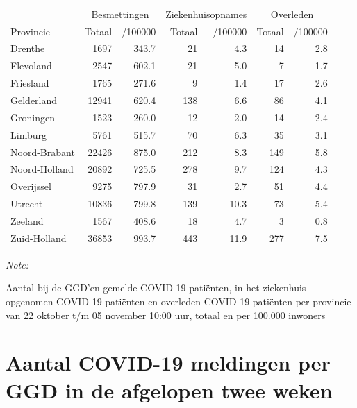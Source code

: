 \documentclass[
  english,
  man,floatsintext]{apa6}
\begin{document}
\begin{table}[H]
\centering
\begin{threeparttable}
\begin{tabular}{lrrrrrr}
\toprule
\multicolumn{1}{c}{ } & \multicolumn{2}{c}{Besmettingen} & \multicolumn{2}{c}{Ziekenhuisopnames} & \multicolumn{2}{c}{Overleden} \\
\cmidrule(l{3pt}r{3pt}){2-3} \cmidrule(l{3pt}r{3pt}){4-5} \cmidrule(l{3pt}r{3pt}){6-7}
Provincie & Totaal & /100000 & Totaal & /100000 & Totaal & /100000\\
\midrule
Drenthe & 1697 & 343.7 & 21 & 4.3 & 14 & 2.8\\
Flevoland & 2547 & 602.1 & 21 & 5.0 & 7 & 1.7\\
Friesland & 1765 & 271.6 & 9 & 1.4 & 17 & 2.6\\
Gelderland & 12941 & 620.4 & 138 & 6.6 & 86 & 4.1\\
Groningen & 1523 & 260.0 & 12 & 2.0 & 14 & 2.4\\
Limburg & 5761 & 515.7 & 70 & 6.3 & 35 & 3.1\\
Noord-Brabant & 22426 & 875.0 & 212 & 8.3 & 149 & 5.8\\
Noord-Holland & 20892 & 725.5 & 278 & 9.7 & 124 & 4.3\\
Overijssel & 9275 & 797.9 & 31 & 2.7 & 51 & 4.4\\
Utrecht & 10836 & 799.8 & 139 & 10.3 & 73 & 5.4\\
Zeeland & 1567 & 408.6 & 18 & 4.7 & 3 & 0.8\\
Zuid-Holland & 36853 & 993.7 & 443 & 11.9 & 277 & 7.5\\
\bottomrule
\end{tabular}
\begin{tablenotes}
\item \textit{Note: } 
\item Aantal bij de GGD’en gemelde COVID-19 patiënten, in het ziekenhuis opgenomen COVID-19 patiënten en overleden COVID-19 patiënten per provincie van 22 oktober t/m 05 november 10:00 uur, totaal en per 100.000 inwoners
\end{tablenotes}
\end{threeparttable}
\end{table}

\newpage

\hypertarget{aantal-covid-19-meldingen-per-ggd-in-de-afgelopen-twee-weken}{%
\section{Aantal COVID-19 meldingen per GGD in de afgelopen twee weken}\label{aantal-covid-19-meldingen-per-ggd-in-de-afgelopen-twee-weken}}
\end{document}
